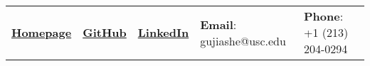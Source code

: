 \documentclass[letterpaper, 10pt]{article}
\begin{document}


\vspace{0.5cm} 
\begin{center}
\begin{tabular}{lllll}
 \href{https://jiashenggu.github.io/}{\textbf{Homepage}}            &
 \href{https://github.com/jiashenggu}{\textbf{GitHub}}              &
 \href{https://www.linkedin.com/in/jiasheng-gu/}{\textbf{LinkedIn}} &
 \textbf{Email}: gujiashe@usc.edu      &
 \textbf{Phone}: +1 (213) 204-0294     

\end{tabular}
\end{center}


\setlength{\tabcolsep}{2pt}
\end{document}
